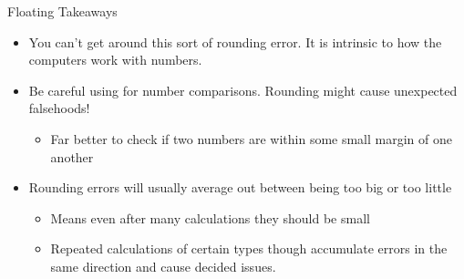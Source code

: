 \documentclass[pdf, aspectratio=169, 12pt]{beamer}
\begin{document}
\begin{frame}{Floating Takeaways}
	\begin{itemize}
		\item You can't get around this sort of rounding error. It is intrinsic to how the computers work with numbers.
		\item Be careful using \pyi{==} for number comparisons. Rounding might cause unexpected falsehoods!
			\begin{itemize}
				\item Far better to check if two numbers are within some small margin of one another
			\end{itemize}
		\item Rounding errors will usually average out between being too big or too little
			\begin{itemize}
				\item Means even after many calculations they should be small
				\item Repeated calculations of certain types though accumulate errors in the same direction and cause decided issues.
			\end{itemize}
	\end{itemize}
\end{frame}

\end{document}

